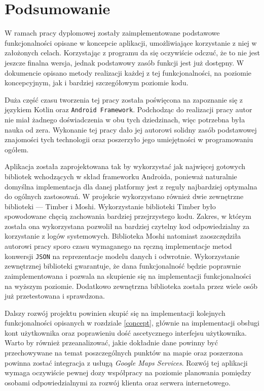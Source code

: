 \documentclass[polish,polish,a4paper,12pt]{article}
\let\sectioncmd\section
\renewcommand{\section}{\clearpage\sectioncmd}
\begin{document}
\section{Podsumowanie}\label{summary}

W ramach pracy dyplomowej zostały zaimplementowane podstawowe funkcjonalności opisane w koncepcie aplikacji, umożliwiające korzystanie z niej w założonych celach. Korzystając z programu da się oczywiście odczuć, że to nie jest jeszcze finalna wersja, jednak podstawowy zasób funkcji jest już dostępny. W dokumencie opisano metody realizacji każdej z tej funkcjonalności, na poziomie koncepcyjnym, jak i bardziej szczegółowym poziomie kodu.

Duża część czasu tworzenia tej pracy została poświęcona na zapoznanie się z językiem Kotlin oraz \texttt{Android Framework}. Podchodząc do realizacji pracy autor nie miał żadnego doświadczenia w obu tych dziedzinach, więc potrzebna była nauka od zera. Wykonanie tej pracy dało jej autorowi solidny zasób podstawowej znajomości tych technologii oraz poszerzyło jego umiejętności w programowaniu ogółem.

Aplikacja została zaprojektowana tak by wykorzystać jak najwięcej gotowych bibliotek wchodzących w skład frameworku Androida, ponieważ naturalnie domyślna implementacja dla danej platformy jest z reguły najbardziej optymalna do ogólnych zastosowań. W projekcie wykorzystano również dwie zewnętrzne biblioteki — Timber i Moshi. Wykorzystanie biblioteki Timber było spowodowane chęcią zachowania bardziej przejrzystego kodu. Zakres, w którym została ona wykorzystana pozwolił na bardziej czytelny kod odpowiedzialny za korzystanie z logów systemowych. Biblioteka Moshi natomiast zaoszczędziła autorowi pracy sporo czasu wymaganego na ręczną implementacje metod konwersji \texttt{JSON} na reprezentacje modelu danych i odwrotnie. Wykorzystanie zewnętrznej biblioteki gwarantuje, że dana funkcjonalność będzie poprawnie zaimplementowana i pozwala na skupienie się na implementacji funkcjonalności na wyższym poziomie. Dodatkowo zewnętrzna biblioteka została przez wiele osób już przetestowana i sprawdzona.

Dalszy rozwój projektu powinien skupić się na implementacji kolejnych funkcjonalności opisanych w rozdziale \ref{concept}, głównie na implementacji obsługi kont użytkownika oraz poprawieniu dość ascetycznego interfejsu użytkownika. Warto by również przeanalizować, jakie dokładnie dane powinny być przechowywane na temat poszczególnych punktów na mapie oraz poszerzona powinna zostać integracja z usługą \textit{Google Maps Services}. Rozwój tej aplikacji wymaga oczywiście pewnej dozy współpracy na poziomie planowania pomiędzy osobami odpowiedzialnymi za rozwój klienta oraz serwera internetowego.

\printbibliography[heading=bibintoc,title={Literatura}]

\renewcommand{\section}{\sectioncmd}
\clearpage

\listoffigures
{}

\listoflistings
{}
\end{document}

